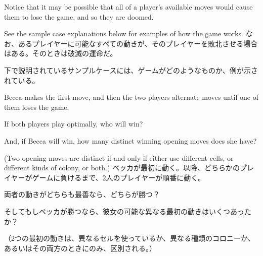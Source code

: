 \documentclass[uplatex,dvipdfmx]{jsarticle} \usepackage{amsmath,amssymb,bm}
\begin{document}
\vspace{\baselineskip}
\begin{paracol}{2}
Notice that it may be possible that all of a player's available moves would cause them to lose the game, and so they are doomed.

See the sample case explanations below for examples of how the game works.
\switchcolumn
なお、あるプレイヤーに可能なすべての動きが、そのプレイヤーを敗北させる場合はある。そのときは破滅の運命だ。

下で説明されているサンプルケースには、ゲームがどのようなものか、例が示されている。
\end{paracol}
\vspace{\baselineskip}
\begin{paracol}{2}
Becca makes the first move, and then the two players alternate moves until one of them loses the game.

If both players play optimally, who will win?

And, if Becca will win, how many distinct winning opening moves does she have?

(Two opening moves are distinct if and only if either use different cells, or different kinds of colony, or both.)
\switchcolumn
ベッカが最初に動く。以降、どちらかのプレイヤーがゲームに負けるまで、2人のプレイヤーが順番に動く。

両者の動きがどちらも最善なら、どちらが勝つ？

そしてもしベッカが勝つなら、彼女の可能な異なる最初の動きはいくつあったか？

（2つの最初の動きは、異なるセルを使っているか、異なる種類のコロニーか、あるいはその両方のときにのみ、区別される。）
\end{paracol}
\end{document}
